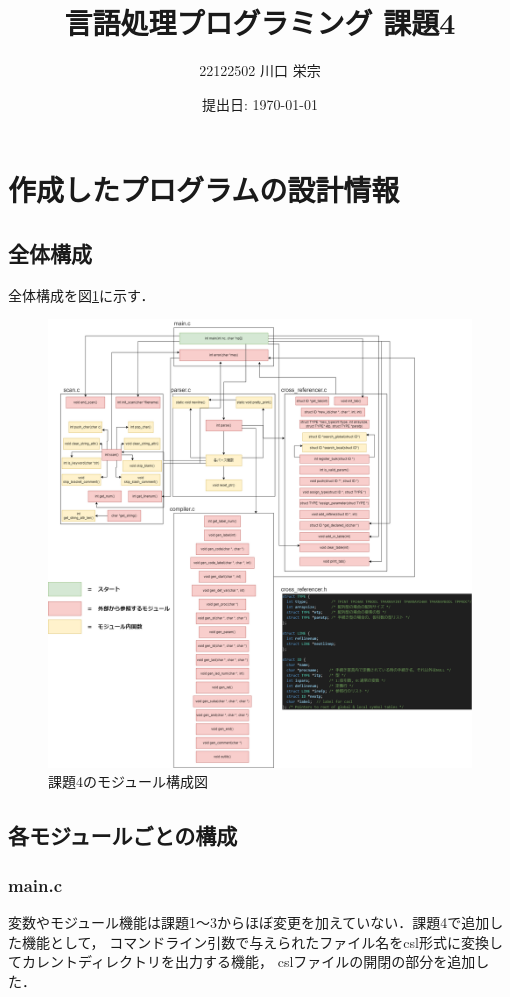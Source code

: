 \documentclass{jlreq}
\title{言語処理プログラミング 課題4}
\author{22122502 川口 栄宗}
\date{提出日: \today}
\begin{document}
\maketitle
\clearpage

\section{作成したプログラムの設計情報}

\subsection{全体構成}

全体構成を図\ref{fig:module_graph}に示す．
\begin{figure}[H]
  \centering
  \includegraphics[width=\textwidth]{assets/lpp04_module.png}
  \caption{課題4のモジュール構成図}
  \label{fig:module_graph}
\end{figure}

\subsection{各モジュールごとの構成}

\subsubsection{main.c}
変数やモジュール機能は課題1～3からほぼ変更を加えていない．課題4で追加した機能として，
コマンドライン引数で与えられたファイル名をcsl形式に変換してカレントディレクトリを出力する機能，
cslファイルの開閉の部分を追加した．
\end{document}
